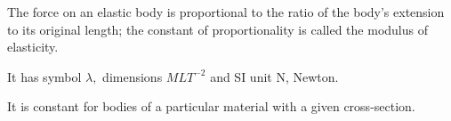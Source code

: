  The force on an elastic body is proportional to the ratio of the body's 
extension to its original length;
the constant of proportionality is called the modulus of
elasticity.
\par
It has symbol $ \lambda , $ dimensions $MLT^{-2}$  and
SI unit N, Newton.
\par
It is constant for bodies of a particular material 
with a given cross-section.
